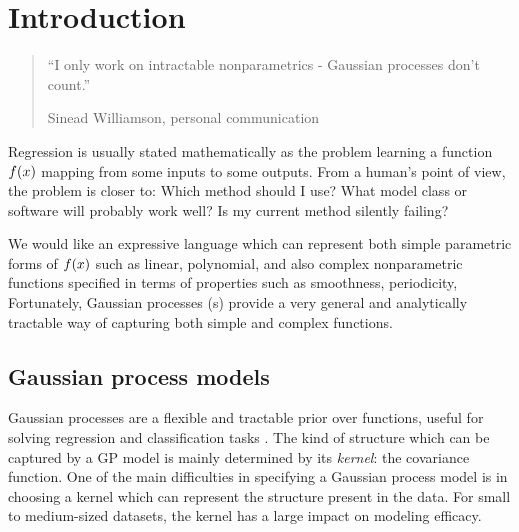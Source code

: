
\inbpdocument

\chapter{Introduction}
\label{ch:intro}


\begin{quotation}
``I only work on intractable nonparametrics - Gaussian processes don't count.''

\hspace*{\fill} Sinead Williamson, personal communication
\end{quotation}


\nomenclature[g-pi]{$\pi$}{ $\simeq 3.14\ldots$}


Regression is usually stated mathematically as the problem learning a function $f(x)$ mapping from some inputs to some outputs.
From a human's point of view, the problem is closer to: Which method should I use?  What model class or software will probably work well?  Is my current method silently failing?


We would like an expressive language which can represent both simple parametric forms of $f(x)$ such as linear, polynomial, \etc and also complex nonparametric functions specified in terms of properties such as smoothness, periodicity, \etc~ 
Fortunately, Gaussian processes (\gp{}s) provide a very general and analytically tractable way of capturing both simple and complex functions. 

\section{Gaussian process models}

Gaussian processes are a flexible and tractable prior over functions, useful for solving regression and classification tasks \citep{rasmussen38gaussian}.  The kind of structure which can be captured by a GP model is mainly determined by its \emph{kernel}: the covariance function.  One of the main difficulties in specifying a Gaussian process model is in choosing a kernel which can represent the structure present in the data.  For small to medium-sized datasets, the kernel has a large impact on modeling efficacy.

